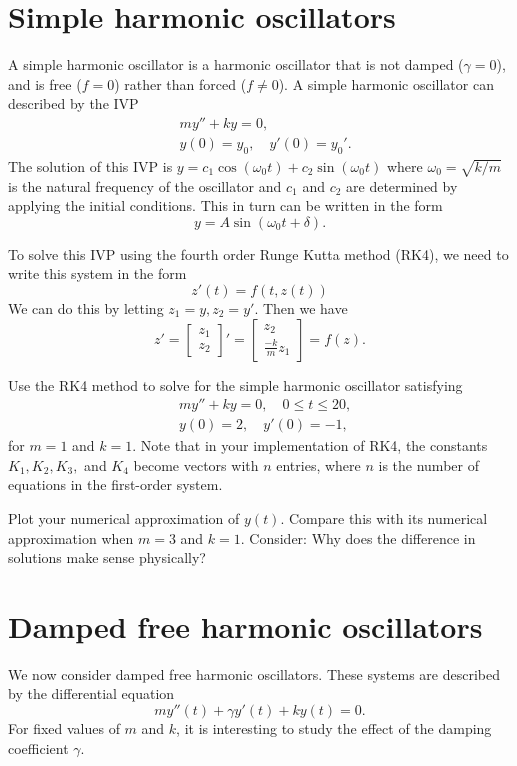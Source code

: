 \section*{Simple harmonic oscillators}
A simple harmonic oscillator is a harmonic oscillator that is not damped ($\gamma =0$), and is free ($f = 0$) rather than forced ($f \not = 0$). 
A simple harmonic oscillator can described by the IVP
\begin{align*}
&{}my'' + ky = 0,\\
&{}y(0) = y_0,\quad
y'(0) = y_0'.
\end{align*}
The solution of this IVP is $y = c_1\cos (\omega_0 t) + c_2 \sin (\omega_0 t)$ where $\omega_0 = \sqrt{k/m}$ is the natural frequency of the oscillator and $c_1$ and $c_2$ are determined by applying the initial conditions. This in turn can be written in the form
\[y = A\sin (\omega_0 t + \delta) .\]

To solve this IVP using the fourth order Runge Kutta method (RK4), we need to write this system in the form
\[z'(t) = f(t,z(t)) \]
We can do this by letting $z_1 = y, z_2 = y'$. Then we have \[     z'=
 \left[\begin{array}{c}z_1 \\z_2\end{array}\right]'  =  \left[\begin{array}{c}z_2 \\\frac{-k}{m}z_1\end{array}\right]= f(z).\]


\begin{problem} Use the RK4 method to solve for the simple harmonic oscillator satisfying 
\begin{align*}
&{}my'' + ky = 0,\quad 0 \leq t \leq 20, \\
&{}y(0) = 2, \quad
y'(0) = -1,
\end{align*}
for $m = 1$ and $k =1$. Note that in your implementation of RK4, the constants $K_1, K_2, K_3,$ and $K_4$ become vectors with $n$ entries, where $n$ is the number of equations in the first-order system.

Plot your numerical approximation of $y(t)$.  
Compare this with its numerical approximation when $m = 3$ and $k =1$. Consider: Why does the difference in solutions make sense physically?
\end{problem}


\section*{Damped free harmonic oscillators} 
We now consider damped free harmonic oscillators. 
These systems are described by the differential equation
\[my''(t) +\gamma y'(t) + ky(t) = 0.\]
For fixed values of $m$ and $k$, it is interesting to study the effect of the damping coefficient $\gamma$.

